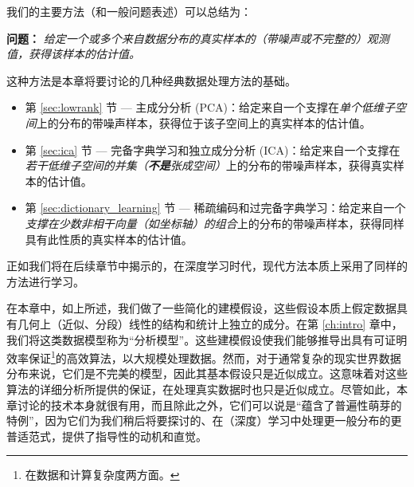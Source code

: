 \documentclass[../../book-main.tex]{subfiles}
\begin{document}
我们的主要方法（和一般问题表述）可以总结为：
\begin{tcolorbox}\centering
    \textbf{问题：} \textit{给定一个或多个来自数据分布的真实样本的（带噪声或不完整的）观测值，获得该样本的估计值。}
\end{tcolorbox}
这种方法是本章将要讨论的几种经典数据处理方法的基础。
\begin{itemize}
    \item 第 \ref{sec:lowrank} 节 --- 主成分分析 (PCA)：给定来自一个支撑在\textit{单个低维子空间}上的分布的带噪声样本，获得位于该子空间上的真实样本的估计值。
    \item 第 \ref{sec:ica} 节 --- 完备字典学习和独立成分分析 (ICA)：给定来自一个支撑在\textit{若干低维子空间的并集（\textbf{不是}张成空间）}上的分布的带噪声样本，获得真实样本的估计值。
    \item 第 \ref{sec:dictionary_learning} 节 --- 稀疏编码和过完备字典学习：给定来自一个\textit{支撑在少数非相干向量（如坐标轴）的组合}上的分布的带噪声样本，获得同样具有此性质的真实样本的估计值。
\end{itemize}
正如我们将在后续章节中揭示的，在深度学习时代，现代方法本质上采用了同样的方法进行学习。

在本章中，如上所述，我们做了一些简化的建模假设，这些假设本质上假定数据具有几何上（近似、分段）线性的结构和统计上独立的成分。在第 \ref{ch:intro} 章中，我们将这类数据模型称为“分析模型”。这些建模假设使我们能够推导出具有可证明效率保证\footnote{在数据和计算复杂度两方面。}的高效算法，以大规模处理数据。然而，对于通常复杂的现实世界数据分布来说，它们是不完美的模型，因此其基本假设只是近似成立。这意味着对这些算法的详细分析所提供的保证，在处理真实数据时也只是近似成立。尽管如此，本章讨论的技术本身就很有用，而且除此之外，它们可以说是“蕴含了普遍性萌芽的特例”，因为它们为我们稍后将要探讨的、在（深度）学习中处理更一般分布的更普适范式，提供了指导性的动机和直觉。%


\end{document}
